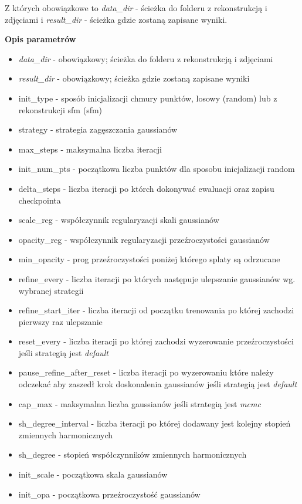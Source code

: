 \lstset{style=pythonstyle}

Z których obowiązkowe to \textit{data\_dir} - ścieżka do folderu z rekonstrukcją i zdjęciami i \textit{result\_dir} - ścieżka gdzie zostaną zapisane wyniki. 

\textbf{Opis parametrów}
\begin{itemize}
  \item \textit{data\_dir} - obowiązkowy; ścieżka do folderu z rekonstrukcją i zdjęciami
  \item \textit{result\_dir} - obowiązkowy; ścieżka gdzie zostaną zapisane wyniki
  \item init\_type - sposób inicjalizacji chmury punktów, losowy (random) lub z rekonstrukcji sfm (sfm)
  \item strategy - strategia zagęszczania gaussianów
  \item max\_steps - maksymalna liczba iteracji
  \item init\_num\_pts - początkowa liczba punktów dla sposobu inicjalizacji random
  \item delta\_steps - liczba iteracji po którch dokonywać ewaluacji oraz zapisu checkpointa
  \item scale\_reg - współczynnik regularyzacji skali gaussianów
  \item opacity\_reg - współczynnik regularyzacji przeźroczystości gaussianów
  \item min\_opacity - prog przeźroczystości poniżej którego splaty są odrzucane
  \item refine\_every - liczba iteracji po których następuje ulepszanie gaussianów wg. wybranej strategii 
  \item refine\_start\_iter - liczba iteracji od początku trenowania po której zachodzi pierwszy raz ulepszanie
  \item reset\_every - liczba iteracji po której zachodzi wyzerowanie przeźroczystości jeśli strategią jest \textit{default}
  \item pause\_refine\_after\_reset - liczba iteracji po wyzerowaniu które należy odczekać aby zaszedł krok doskonalenia gaussianów jeśli strategią jest \textit{default}
  \item cap\_max - maksymalna liczba gaussianów jeśli strategią jest \textit{mcmc}
  \item sh\_degree\_interval - liczba iteracji po której dodawany jest kolejny stopień zmiennych harmonicznych
  \item sh\_degree - stopień współczynników zmiennych harmonicznych 
  \item init\_scale - początkowa skala gaussianów 
  \item init\_opa - początkowa przeźroczystość gaussianów
\end{itemize}